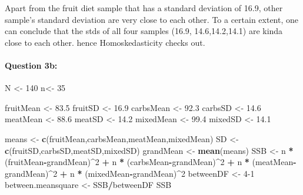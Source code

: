 \documentclass[
]{article}
\newenvironment{Shaded}{\begin{snugshade}}{\end{snugshade}}
\newcommand{\DecValTok}[1]{\textcolor[rgb]{0.00,0.00,0.81}{#1}}
\newcommand{\FloatTok}[1]{\textcolor[rgb]{0.00,0.00,0.81}{#1}}
\newcommand{\FunctionTok}[1]{\textcolor[rgb]{0.13,0.29,0.53}{\textbf{#1}}}
\newcommand{\NormalTok}[1]{#1}
\newcommand{\OtherTok}[1]{\textcolor[rgb]{0.56,0.35,0.01}{#1}}
\newcommand{\SpecialCharTok}[1]{\textcolor[rgb]{0.81,0.36,0.00}{\textbf{#1}}}
\begin{document}
Apart from the fruit diet sample that has a standard deviation of 16.9,
other sample's standard deviation are very close to each other. To a
certain extent, one can conclude that the stds of all four samples
(16.9, 14.6,14.2,14.1) are kinda close to each other. hence
Homoskedasticity checks out.

\hypertarget{question-3b}{%
\paragraph{Question 3b:}\label{question-3b}}

\begin{Shaded}
\begin{Highlighting}[]
\NormalTok{N }\OtherTok{\textless{}{-}} \DecValTok{140}
\NormalTok{n}\OtherTok{\textless{}{-}} \DecValTok{35}

\NormalTok{fruitMean }\OtherTok{\textless{}{-}} \FloatTok{83.5}
\NormalTok{fruitSD }\OtherTok{\textless{}{-}} \FloatTok{16.9}
\NormalTok{carbsMean }\OtherTok{\textless{}{-}} \FloatTok{92.3}
\NormalTok{carbsSD }\OtherTok{\textless{}{-}} \FloatTok{14.6}
\NormalTok{meatMean }\OtherTok{\textless{}{-}} \FloatTok{88.6}
\NormalTok{meatSD }\OtherTok{\textless{}{-}} \FloatTok{14.2}
\NormalTok{mixedMean }\OtherTok{\textless{}{-}} \FloatTok{99.4}
\NormalTok{mixedSD }\OtherTok{\textless{}{-}} \FloatTok{14.1}


\NormalTok{means }\OtherTok{\textless{}{-}} \FunctionTok{c}\NormalTok{(fruitMean,carbsMean,meatMean,mixedMean)}
\NormalTok{SD }\OtherTok{\textless{}{-}} \FunctionTok{c}\NormalTok{(fruitSD,carbsSD,meatSD,mixedSD)}
\NormalTok{grandMean }\OtherTok{\textless{}{-}} \FunctionTok{mean}\NormalTok{(means)}
\NormalTok{SSB }\OtherTok{\textless{}{-}}\NormalTok{ n }\SpecialCharTok{*}\NormalTok{ (fruitMean}\SpecialCharTok{{-}}\NormalTok{grandMean)}\SpecialCharTok{\^{}}\DecValTok{2} \SpecialCharTok{+}\NormalTok{ n }\SpecialCharTok{*}\NormalTok{ (carbsMean}\SpecialCharTok{{-}}\NormalTok{grandMean)}\SpecialCharTok{\^{}}\DecValTok{2} \SpecialCharTok{+}\NormalTok{ n }\SpecialCharTok{*}\NormalTok{ (meatMean}\SpecialCharTok{{-}}\NormalTok{grandMean)}\SpecialCharTok{\^{}}\DecValTok{2} \SpecialCharTok{+}\NormalTok{ n }\SpecialCharTok{*}\NormalTok{ (mixedMean}\SpecialCharTok{{-}}\NormalTok{grandMean)}\SpecialCharTok{\^{}}\DecValTok{2}
\NormalTok{betweenDF }\OtherTok{\textless{}{-}} \DecValTok{4{-}1}
\NormalTok{between.meansquare }\OtherTok{\textless{}{-}}\NormalTok{ SSB}\SpecialCharTok{/}\NormalTok{betweenDF}
\NormalTok{SSB}
\end{Highlighting}
\end{Shaded}
\end{document}
